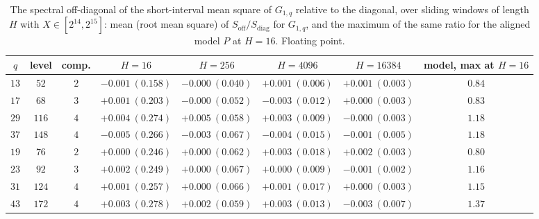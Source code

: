 \documentclass[11pt]{amsart}
\theoremstyle{remark}
\begin{document}
\begin{table}[htbp]
\centering\footnotesize
\setlength{\tabcolsep}{4pt}
\begin{tabular}{ccc|cccc|c}
\toprule
$q$ & level & comp. & $H=16$ & $H=256$ & $H=4096$ & $H=16384$ & model, max at $H=16$\\
\midrule
$13$ & $52$ & $2$ & $-0.001\ (0.158)$ & $-0.000\ (0.040)$ & $+0.001\ (0.006)$ & $+0.001\ (0.003)$ & $0.84$\\
$17$ & $68$ & $3$ & $+0.001\ (0.203)$ & $-0.000\ (0.052)$ & $-0.003\ (0.012)$ & $+0.000\ (0.003)$ & $0.83$\\
$29$ & $116$ & $4$ & $+0.004\ (0.274)$ & $+0.005\ (0.058)$ & $+0.003\ (0.009)$ & $-0.000\ (0.003)$ & $1.18$\\
$37$ & $148$ & $4$ & $-0.005\ (0.266)$ & $-0.003\ (0.067)$ & $-0.004\ (0.015)$ & $-0.001\ (0.005)$ & $1.18$\\
$19$ & $76$ & $2$ & $+0.000\ (0.246)$ & $+0.000\ (0.062)$ & $+0.003\ (0.018)$ & $+0.002\ (0.003)$ & $0.80$\\
$23$ & $92$ & $3$ & $+0.002\ (0.249)$ & $+0.000\ (0.067)$ & $+0.000\ (0.009)$ & $-0.001\ (0.002)$ & $1.16$\\
$31$ & $124$ & $4$ & $+0.001\ (0.257)$ & $+0.000\ (0.066)$ & $+0.001\ (0.017)$ & $+0.000\ (0.003)$ & $1.15$\\
$43$ & $172$ & $4$ & $+0.003\ (0.278)$ & $+0.002\ (0.059)$ & $+0.003\ (0.013)$ & $-0.003\ (0.007)$ & $1.37$\\
\bottomrule
\end{tabular}
\caption{The spectral off-diagonal of the short-interval mean square of $G_{1,q}$ relative to the diagonal, over sliding windows of length $H$ with $X\in[2^{14},2^{15}]$: mean (root mean square) of $S_{\mathrm{off}}/S_{\mathrm{diag}}$ for $G_{1,q}$, and the maximum of the same ratio for the aligned model $P$ at $H=16$. Floating point.}
\label{tab:spectral}
\end{table}
\end{document}
